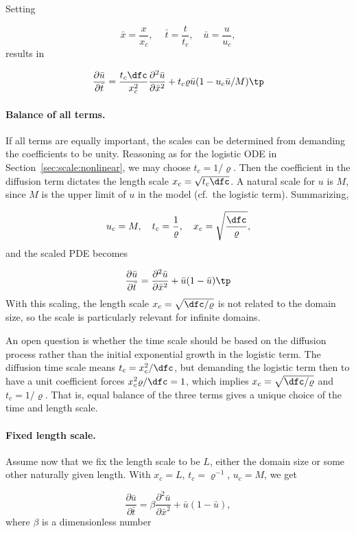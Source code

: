 \documentclass[graybox,envcountchap,sectrefs,final]{svmonodo}
\begin{document}
Setting

\[ \bar x = \frac{x}{x_c},\quad
\ \bar t = \frac{t}{t_c}, \quad\bar u =\frac{u}{u_c},\]
results in

\[
\frac{\partial \bar u}{\partial \bar t} =
\frac{t_c\dfc}{x_c^2}
\frac{\partial^2\bar u}{\partial\bar x^2} + t_c \varrho \bar u (1 - u_c\bar u/M)\tp
\]

\paragraph{Balance of all terms.}
If all terms are equally important, the scales can be determined from
demanding the coefficients to be unity.
Reasoning as for the logistic ODE in Section~\ref{sec:scale:nonlinear},
we may choose $t_c=1/\varrho$. Then
the coefficient in the diffusion term dictates the length scale $x_c =
\sqrt{t_c\dfc}$.
A natural scale for $u$ is $M$, since $M$ is the upper limit of $u$ in
the model (cf.~the logistic term). Summarizing,

\[ u_c=M,\quad t_c = \frac{1}{\varrho},\quad x_c = \sqrt{\frac{\dfc}{\varrho}},
\]
and the scaled PDE becomes

\begin{equation}
\frac{\partial \bar u}{\partial \bar t} =
\frac{\partial^2 \bar u}{\partial\bar x^2} + \bar u (1 - \bar u)\tp
\end{equation}
With this scaling, the length scale $x_c=\sqrt{\dfc/\varrho}$
is not related to the domain size, so the scale is particularly relevant for
infinite domains.

An open question is whether the time scale should be based on
the diffusion process rather than the initial exponential growth
in the logistic term. The diffusion time scale means $t_c = x_c^2/\dfc$,
but demanding the logistic term then to have a unit coefficient
forces $x_c^2\varrho /\dfc = 1$, which implies $x_c=\sqrt{\dfc/\varrho}$
and $t_c=1/\varrho$. That is, equal balance of the three
terms gives a unique choice of the time and length scale.

\paragraph{Fixed length scale.}
Assume now that we fix the length scale to be $L$, either the
domain size or some other naturally given length. With
$x_c=L$, $t_c=\varrho^{-1}$,
$u_c=M$, we get

\begin{equation}
\frac{\partial \bar u}{\partial \bar t} =
\beta
\frac{\partial^2 \bar u}{\partial\bar x^2} + \bar u (1 - \bar u),
\end{equation}
where $\beta$ is a dimensionless number
\end{document}
